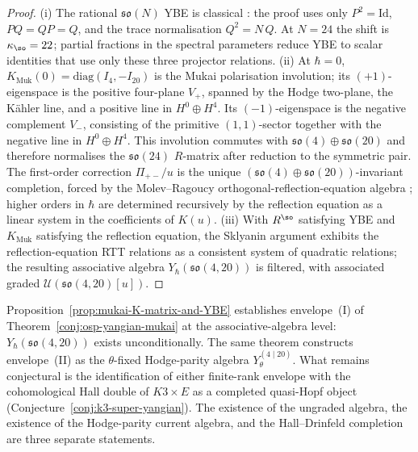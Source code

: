 \begin{proof}
\textup{(i)} The rational $\mathfrak{so}(N)$ YBE is classical
\cite{Reshetikhin1985, MolevRagoucy2008}: the proof uses only
$P^2 = \mathrm{Id}$, $P Q = Q P = Q$, and the trace normalisation
$Q^2 = N\, Q$. At $N = 24$ the shift is $\kappa_{\so} = 22$; partial
fractions in the spectral parameters reduce YBE to scalar identities
that use only these three projector relations.
\textup{(ii)} At $\hbar = 0$, $K_{\mathrm{Muk}}(0) = \mathrm{diag}(I_4, -I_{20})$
is the Mukai polarisation involution; its $(+1)$-eigenspace is the
positive four-plane \(V_+\), spanned by the Hodge two-plane, the K\"ahler
line, and a positive line in \(H^0\oplus H^4\). Its \((-1)\)-eigenspace
is the negative complement \(V_-\), consisting of the primitive
\((1,1)\)-sector together with the negative line in \(H^0\oplus H^4\).
This involution
commutes with $\mathfrak{so}(4) \oplus \mathfrak{so}(20)$ and
therefore normalises the $\mathfrak{so}(24)$ $R$-matrix after
reduction to the symmetric pair. The first-order correction
$\Pi_{+-}/u$ is the unique $(\mathfrak{so}(4) \oplus
\mathfrak{so}(20))$-invariant completion, forced by the
Molev--Ragoucy orthogonal-reflection-equation algebra
\cite{MolevRagoucy2008}; higher orders in $\hbar$ are determined
recursively by the reflection equation as a linear system in the
coefficients of $K(u)$.
\textup{(iii)} With $R^{\so}$ satisfying YBE and $K_{\mathrm{Muk}}$
satisfying the reflection equation, the Sklyanin argument exhibits
the reflection-equation RTT relations as a consistent system of
quadratic relations; the resulting associative algebra
$Y_\hbar(\mathfrak{so}(4, 20))$ is filtered, with associated graded
$\mathcal U(\mathfrak{so}(4, 20)[u])$.
\end{proof}

\begin{remark}
\label{rem:osp-scope-upgrade}
Proposition~\ref{prop:mukai-K-matrix-and-YBE} establishes envelope~(I)
of Theorem~\ref{conj:osp-yangian-mukai} at the associative-algebra
level: $Y_\hbar(\mathfrak{so}(4, 20))$ exists unconditionally. The
same theorem constructs envelope~(II) as the $\theta$-fixed
Hodge-parity algebra $Y_\theta^{(4\mid20)}$. What remains conjectural
is the identification of either finite-rank envelope with the
cohomological Hall double of $K3\times E$ as a completed
quasi-Hopf object (Conjecture~\ref{conj:k3-super-yangian}). The
existence of the ungraded algebra, the existence of the Hodge-parity
current algebra, and the Hall--Drinfeld completion are three separate
statements.
\end{remark}

